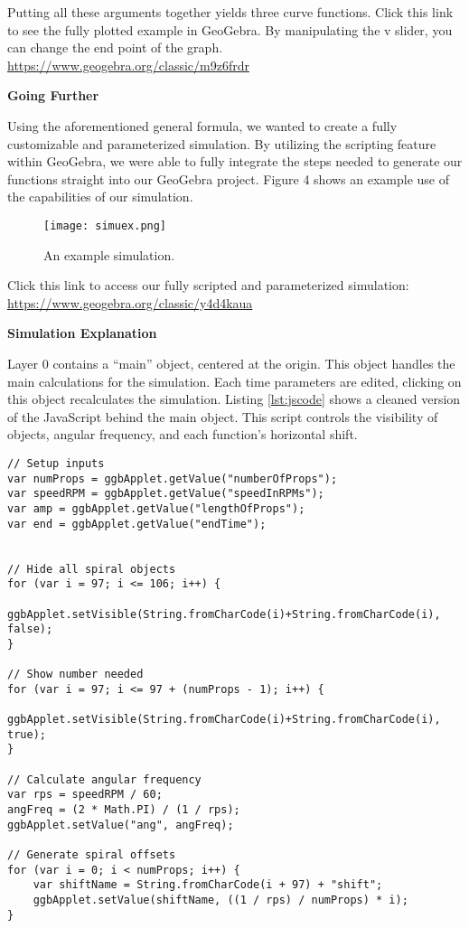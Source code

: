 Putting all these arguments together yields three curve functions.
Click this link to see the fully plotted example in GeoGebra. By manipulating the v slider, you can change the end point of the graph.
\url{https://www.geogebra.org/classic/m9z6frdr}

\noindent
\textbf{Going Further}

Using the aforementioned general formula, we wanted to create a fully customizable and parameterized simulation. By utilizing the scripting feature within GeoGebra, we were able to fully integrate the steps needed to generate our functions straight into our GeoGebra project. Figure 4 shows an example use of the capabilities of our simulation.
\renewcommand{\thefigure}{4}
\begin{figure}[ht]
\texttt{[image: simuex.png]}
\caption{An example simulation.}
\label{fig:simuex1}
\end{figure}

Click this link to access our fully scripted and parameterized simulation: \url{https://www.geogebra.org/classic/y4d4kaua}

\noindent
\textbf{Simulation Explanation}

Layer 0 contains a “main” object, centered at the origin. This object handles the main calculations for the simulation. Each time parameters are edited, clicking on this object recalculates the simulation.
Listing \ref{lst:jscode} shows a cleaned version of the JavaScript behind the main object. This script controls the visibility of objects, angular frequency, and each function's horizontal shift.
\begin{lstlisting}[caption={JavaScript attached to main object},label={lst:jscode},captionpos=b]
// Setup inputs
var numProps = ggbApplet.getValue("numberOfProps");
var speedRPM = ggbApplet.getValue("speedInRPMs");
var amp = ggbApplet.getValue("lengthOfProps");
var end = ggbApplet.getValue("endTime");


// Hide all spiral objects
for (var i = 97; i <= 106; i++) {
    ggbApplet.setVisible(String.fromCharCode(i)+String.fromCharCode(i), false);
}

// Show number needed
for (var i = 97; i <= 97 + (numProps - 1); i++) {
    ggbApplet.setVisible(String.fromCharCode(i)+String.fromCharCode(i), true);
}

// Calculate angular frequency
var rps = speedRPM / 60;
angFreq = (2 * Math.PI) / (1 / rps);
ggbApplet.setValue("ang", angFreq);

// Generate spiral offsets
for (var i = 0; i < numProps; i++) {
    var shiftName = String.fromCharCode(i + 97) + "shift";
    ggbApplet.setValue(shiftName, ((1 / rps) / numProps) * i);
}

\end{lstlisting}

